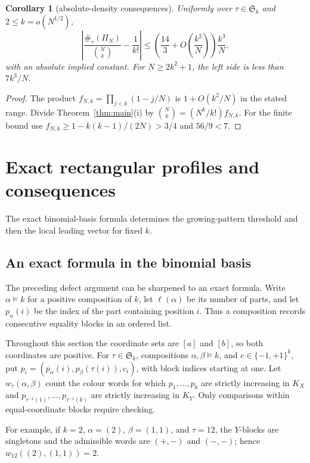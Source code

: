 \documentclass[11pt,letterpaper]{article}
\newtheorem{corollary}[theorem]{Corollary}
\newcommand{\Ssym}{\mathfrak S}
\begin{document}
\begin{corollary}[absolute-density consequences]\label{cor:growing-coefficient}
Uniformly over $\tau\in\Ssym_k$ and $2\le k=o(N^{1/2})$,
\begin{equation}\label{eq:growing-k-absolute}
 \left|\frac{\#_\tau(\Pi_N)}{\binom Nk}-\frac1{k!}\right|
 \le\left(\frac{14}{3}+O\left(\frac{k^2}{N}\right)\right)\frac{k^3}{N},
\end{equation}
with an absolute implied constant. For $N\ge2k^2+1$, the left side is
less than $7k^3/N$.
\end{corollary}
\begin{proof}
The product $f_{N,k}=\prod_{j<k}(1-j/N)$ is $1+O(k^2/N)$ in the stated
range. Divide Theorem~\ref{thm:main}(i) by
$\binom Nk=(N^k/k!)f_{N,k}$. For the finite bound use
$f_{N,k}\ge1-k(k-1)/(2N)>3/4$ and $56/9<7$.
\end{proof}

\section{Exact rectangular profiles and consequences}\label{sec:rectangles}

The exact binomial-basis formula determines the growing-pattern threshold
and then the local leading vector for fixed $k$.

\subsection{An exact formula in the binomial basis}

The preceding defect argument can be sharpened to an exact formula.  Write
$\alpha\vDash k$ for a positive composition of $k$, let
$\ell(\alpha)$ be its number of parts, and let $p_\alpha(i)$ be the
index of the part containing position $i$.  Thus a composition records
consecutive equality blocks in an ordered list.

Throughout this section the coordinate sets are $[a]$ and $[b]$, so both
coordinates are positive. For $\tau\in\Ssym_k$, compositions
$\alpha,\beta\vDash k$, and $c\in\{-1,+1\}^k$, put
$p_i=(p_\alpha(i),p_\beta(\tau(i)),c_i)$, with block indices starting at one.
Let $w_\tau(\alpha,\beta)$ count the colour words for which
$p_1,\ldots,p_k$ are strictly increasing in $K_X$ and
$p_{\tau^{-1}(1)},\ldots,p_{\tau^{-1}(k)}$ are strictly increasing in $K_Y$.
Only comparisons within equal-coordinate blocks require checking.

For example, if $k=2$, $\alpha=(2)$, $\beta=(1,1)$, and $\tau=12$,
the $Y$-blocks are singletons and the admissible words are $(+,-)$ and
$(-,-)$; hence $w_{12}((2),(1,1))=2$.
\end{document}
